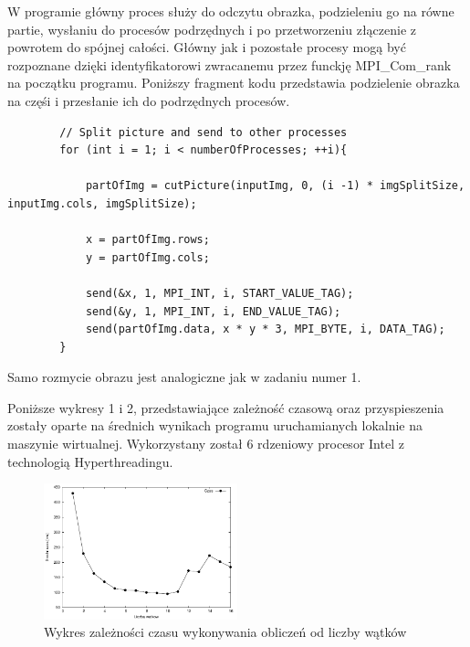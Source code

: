 \documentclass[a4paper,12pt]{article}
\begin{document}
W programie główny proces służy do odczytu obrazka, podzieleniu go na równe partie, wysłaniu do procesów podrzędnych i po przetworzeniu złączenie z powrotem do spójnej całości.
Główny jak i pozostałe procesy mogą być rozpoznane dzięki identyfikatorowi zwracanemu przez funckję MPI\_Com\_rank na początku programu. Poniższy fragment kodu przedstawia podzielenie obrazka na częśi i przesłanie ich do podrzędnych procesów.

\begin{lstlisting}
        // Split picture and send to other processes
        for (int i = 1; i < numberOfProcesses; ++i){

            partOfImg = cutPicture(inputImg, 0, (i -1) * imgSplitSize, inputImg.cols, imgSplitSize);

            x = partOfImg.rows;
            y = partOfImg.cols;
            
            send(&x, 1, MPI_INT, i, START_VALUE_TAG);
            send(&y, 1, MPI_INT, i, END_VALUE_TAG);
            send(partOfImg.data, x * y * 3, MPI_BYTE, i, DATA_TAG);
        }
\end{lstlisting}

Samo rozmycie obrazu jest analogiczne jak w zadaniu numer 1.

Poniższe wykresy 1 i 2, przedstawiające zależność czasową oraz przyspieszenia zostały oparte na średnich wynikach programu uruchamianych lokalnie na maszynie wirtualnej. Wykorzystany został 6 rdzeniowy procesor Intel z technologią Hyperthreadingu.

\begin{figure}[!ht]
	\centering
  \includegraphics[width=0.5\textwidth]{wykresCzas.pdf}
  \caption{Wykres zależności czasu wykonywania obliczeń od liczby wątków}
\end{figure}
\end{document}
